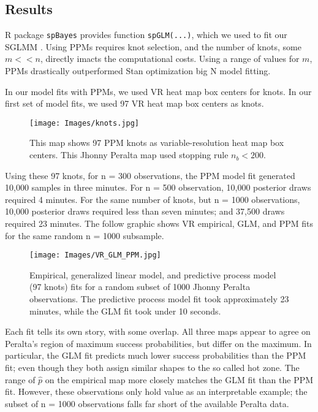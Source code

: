 \subsection{Results}

R package \verb|spBayes| provides function \verb|spGLM(...)|, which we used to fit our SGLMM \citep{Finley2013}. Using PPMs requires  knot selection, and the number of knots, some $m < < n$, directly imacts the computational costs. Using a range of values for $m$, PPMs drastically outperformed Stan optimization big N model fitting. 

In our model fits with PPMs, we used VR heat map box centers for knots. In our first set of model fits, we used 97 VR heat map box centers as knots. 
  \begin{figure}[H]
	\centering 
	\texttt{[image: Images/knots.jpg]}
	\caption{This map shows 97 PPM knots as variable-resolution heat map box centers. This Jhonny Peralta map used stopping rule $n_{b} < 200$.}
	\end{figure}
Using these 97 knots, for n = 300 observations, the PPM model fit generated 10,000 samples in three minutes. For n = 500 observation, 10,000 posterior draws required 4 minutes. For the same number of knots, but n = 1000 observations, 10,000 posterior draws required less than seven minutes; and 37,500 draws required 23 minutes. The follow graphic shows VR empirical, GLM, and PPM fits for the same random n = 1000 subsample.
  \begin{figure}[H]
	\centering 
	\texttt{[image: Images/VR\_GLM\_PPM.jpg]}
	\caption{Empirical, generalized linear model, and predictive process model (97 knots) fits for a random subset of 1000 Jhonny Peralta observations. The predictive process model fit took approximately 23 minutes, while the GLM fit took under 10 seconds.}
	\label{fig:comps1}
	\end{figure}
Each fit tells its own story, with some overlap. All three maps appear to agree on Peralta's region of maximum success probabilities, but differ on the maximum. In particular, the GLM fit predicts much lower success probabilities than the PPM fit; even though they both assign similar shapes to the so called hot zone. The range of $\hat{p}$ on the empirical map more closely matches the GLM fit than the PPM fit. However, these observations only hold value as an interpretable example; the subset of n = 1000 observations falls far short of the available Peralta data.

